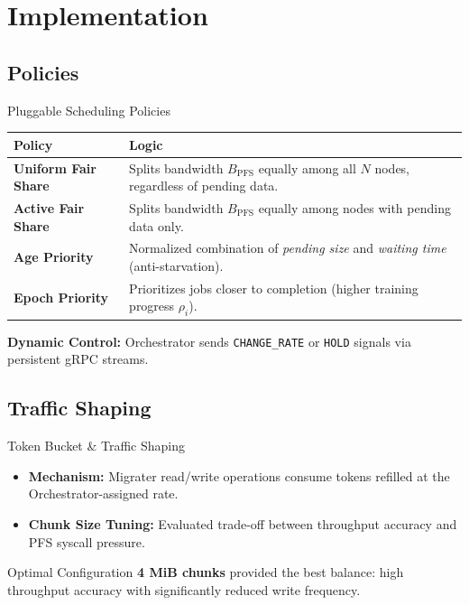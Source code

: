 \documentclass[handout]{beamer}
\begin{document}
\section{Implementation}

\subsection{Policies}
\begin{frame}{Pluggable Scheduling Policies}
    \scriptsize
    \centering
    \begin{tabular}{lp{7cm}}
        \toprule
        \textbf{Policy} & \textbf{Logic} \\
        \midrule
        \textbf{Uniform Fair Share} & Splits bandwidth $B_{\text{PFS}}$ equally among all $N$ nodes, regardless of pending data. \\
        \textbf{Active Fair Share} & Splits bandwidth $B_{\text{PFS}}$ equally among nodes with pending data only. \\
        \textbf{Age Priority}      & Normalized combination of \textit{pending size} and \textit{waiting time} (anti-starvation). \\
        \textbf{Epoch Priority}    & Prioritizes jobs closer to completion (higher training progress $\rho_i$). \\
        \bottomrule
    \end{tabular}

    \vspace{1em}
    \small \justifying
    \textbf{Dynamic Control:} Orchestrator sends \texttt{CHANGE\_RATE} or \texttt{HOLD} signals via persistent gRPC streams.
\end{frame}

\subsection{Traffic Shaping}
\begin{frame}{Token Bucket \& Traffic Shaping}
    \small
    \begin{itemize}
        \item \textbf{Mechanism:} Migrater read/write operations consume tokens refilled at the Orchestrator-assigned rate.
        \item \textbf{Chunk Size Tuning:} Evaluated trade-off between throughput accuracy and PFS syscall pressure.
    \end{itemize}
    \begin{exampleblock}{Optimal Configuration}
        \textbf{4 MiB chunks} provided the best balance: high throughput accuracy with significantly reduced write frequency.
    \end{exampleblock}
\end{frame}
\end{document}
